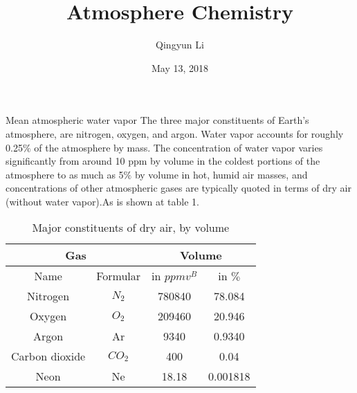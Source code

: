 \documentclass{article}
\author{Qingyun Li}
\date{May 13, 2018}
\title{Atmosphere Chemistry}
\begin{document}
\maketitle
 \par 
Mean atmospheric water vapor
The three major constituents of Earth's atmosphere, are nitrogen, oxygen, and argon. Water vapor accounts for roughly 0.25$\%$ of the atmosphere by mass. The concentration of water vapor varies significantly from around 10 ppm by volume in the coldest portions of the atmosphere to as much as 5$\%$  by volume in hot, humid air masses, and concentrations of other atmospheric gases are typically quoted in terms of dry air (without water vapor).As is shown at table 1. 
\begin{table}[htbp]
\centering
\caption{Major constituents of dry air, by volume}
\begin{tabular}{|c|c|c|c|}
\hline
\multicolumn{2}{|c|}{Gas} & \multicolumn{2}{|c|}{Volume} \\
\hline 
Name & Formular & in $ppmv^{B}$ & in $\%$ \\
\hline 
Nitrogen & $N_{2}$ & 780840 & 78.084 \\
\hline 
Oxygen & $O_{2}$ & 209460 & 20.946 \\
\hline 
Argon & Ar & 9340 & 0.9340 \\
\hline
Carbon dioxide & $CO_{2}$ & 400 & 0.04 \\
\hline
Neon & Ne & 18.18 & 0.001818 \\
\hline
\end{tabular} 
\end{table}


\end{document}
